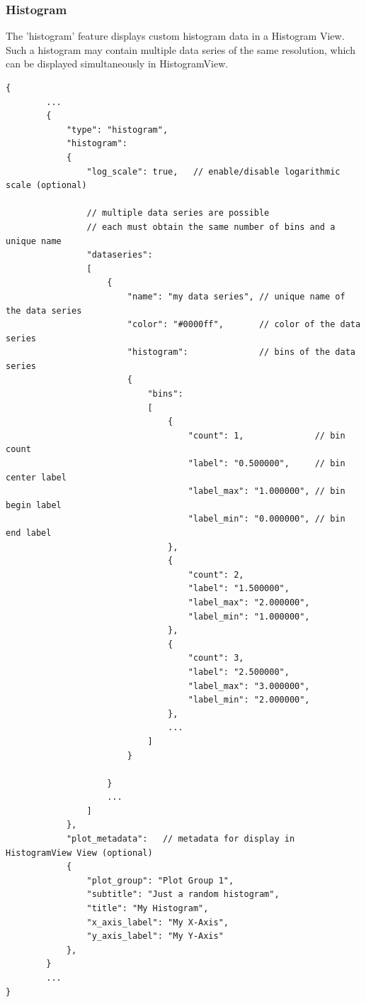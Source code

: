 \subsubsection{Histogram} The 'histogram' feature displays custom histogram data in a Histogram View. 
Such a histogram may contain multiple data series of the same resolution, which can be
displayed simultaneously in HistogramView.

\begin{lstlisting}[basicstyle=\small\ttfamily]
{
        ...
        {
            "type": "histogram",
            "histogram": 
            {
                "log_scale": true,   // enable/disable logarithmic scale (optional)

                // multiple data series are possible 
                // each must obtain the same number of bins and a unique name
                "dataseries": 
                [
                    {
                        "name": "my data series", // unique name of the data series
                        "color": "#0000ff",       // color of the data series
                        "histogram":              // bins of the data series
                        {
                            "bins": 
                            [
                                {
                                    "count": 1,              // bin count
                                    "label": "0.500000",     // bin center label
                                    "label_max": "1.000000", // bin begin label
                                    "label_min": "0.000000", // bin end label
                                },
                                {
                                    "count": 2,
                                    "label": "1.500000",
                                    "label_max": "2.000000",
                                    "label_min": "1.000000",
                                },
                                {
                                    "count": 3,
                                    "label": "2.500000",
                                    "label_max": "3.000000",
                                    "label_min": "2.000000",
                                },
                                ...
                            ]
                        }
                        
                    }
                    ...
                ]
            },
            "plot_metadata":   // metadata for display in HistogramView View (optional)
            {
                "plot_group": "Plot Group 1",
                "subtitle": "Just a random histogram",
                "title": "My Histogram",
                "x_axis_label": "My X-Axis",
                "y_axis_label": "My Y-Axis"
            },
        }
        ...
}
\end{lstlisting}

